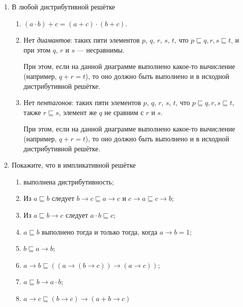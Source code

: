 \documentclass[10pt,a4paper,oneside]{article}
\begin{document}
\begin{enumerate}
\item В любой дистрибутивной решётке
\begin{enumerate}
\item $(a \cdot b) + c = (a + c) \cdot (b + c)$.
\item Нет \emph{диамантов}: таких пяти элементов $p$, $q$, $r$, $s$, $t$, что 
$p \sqsubseteq q, r, s \sqsubseteq t$, и при этом $q$, $r$ и $s$ --- несравнимы.

\begin{center}
\end{center}

При этом, если на данной диаграмме выполнено какое-то вычисление
(например, $q + r = t$), то оно должно быть выполнено и в исходной дистрибутивной решётке.


\item Нет \emph{пентагонов}: таких пяти элементов $p$, $q$, $r$, $s$, $t$, что 
$p \sqsubseteq q, r, s \sqsubseteq t$, также $r \sqsubseteq s$, элемент же
$q$ не сравним с $r$ и $s$.

\begin{center}\end{center}

При этом, если на данной диаграмме выполнено какое-то вычисление
(например, $q + r = t$), то оно должно быть выполнено и в исходной дистрибутивной решётке.

\end{enumerate}

\item Покажите, что в импликативной решётке
\begin{enumerate}
\item выполнена дистрибутивность;
\item Из $a \sqsubseteq b$ следует $b\to c \sqsubseteq a\to c$ и $c\to a \sqsubseteq c \to b$;
\item Из $a \sqsubseteq b \to c$ следует $a \cdot b \sqsubseteq c$;
\item $a \sqsubseteq b$ выполнено тогда и только тогда, когда $a \to b = 1$;
\item $b \sqsubseteq a \rightarrow b$;
\item $a \rightarrow b \sqsubseteq ((a \rightarrow (b \rightarrow c)) \rightarrow (a \rightarrow c))$;
\item $a \sqsubseteq b \rightarrow a \cdot b$;
\item $a \rightarrow c \sqsubseteq (b \rightarrow c) \rightarrow (a + b \rightarrow c)$
\end{enumerate}


\end{enumerate}
\end{document}
